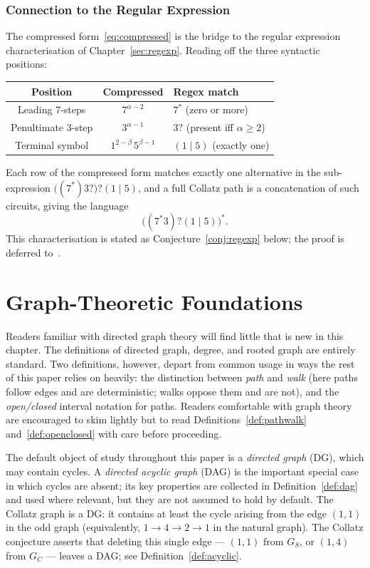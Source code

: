 \documentclass[11pt,a4paper]{article}
\theoremstyle{remark}
\theoremstyle{plain}
\begin{document}
\subsubsection{Connection to the Regular Expression}
\label{sec:compreg}

The compressed form~\eqref{eq:compressed} is the bridge to the regular expression
characterisation of Chapter~\ref{sec:regexp}.
Reading off the three syntactic positions:

\begin{center}
\begin{tabular}{c|c|l}
\toprule
Position & Compressed & Regex match \\
\midrule
Leading 7-steps & $7^{\alpha-2}$ & $7^*$ (zero or more) \\
Penultimate 3-step & $3^{\alpha-1}$ & $3?$ (present iff $\alpha \geq 2$) \\
Terminal symbol & $1^{2-\beta}\,5^{\beta-1}$ & $(1\mid 5)$ (exactly one) \\
\bottomrule
\end{tabular}
\end{center}

Each row of the compressed form matches exactly one alternative in the
sub-expression $\bigl((7^*)3?\bigr)?(1\mid 5)$, and a full Collatz path is
a concatenation of such circuits, giving the language
\[
  \bigl((7^*3)?(1\mid 5)\bigr)^*.
\]
This characterisation is stated as Conjecture~\ref{conj:regexp} below;
the proof is deferred to~\cite{paper5}.

\clearpage
\section{Graph-Theoretic Foundations}
\label{sec:graphs}

Readers familiar with directed graph theory will find little that is new in this chapter.
The definitions of directed graph, degree, and rooted graph are entirely standard.
Two definitions, however, depart from common usage in ways the rest of this paper relies
on heavily: the distinction between \emph{path} and \emph{walk} (here paths follow edges
and are deterministic; walks oppose them and are not), and the \emph{open/closed} interval
notation for paths.
Readers comfortable with graph theory are encouraged to skim lightly but to read
Definitions~\ref{def:pathwalk} and~\ref{def:openclosed} with care before proceeding.

The default object of study throughout this paper is a \emph{directed graph} (DG),
which may contain cycles.
A \emph{directed acyclic graph} (DAG) is the important special case in which cycles
are absent; its key properties are collected in Definition~\ref{def:dag} and used
where relevant, but they are not assumed to hold by default.
The Collatz graph is a DG: it contains at least the cycle arising from the edge
$(1,1)$ in the odd graph (equivalently, $1 \to 4 \to 2 \to 1$ in the natural graph).
The Collatz conjecture asserts that deleting this single edge --- $(1,1)$ from
$G_S$, or $(1,4)$ from $G_C$ --- leaves a DAG; see
Definition~\ref{def:acyclic}.
\end{document}
